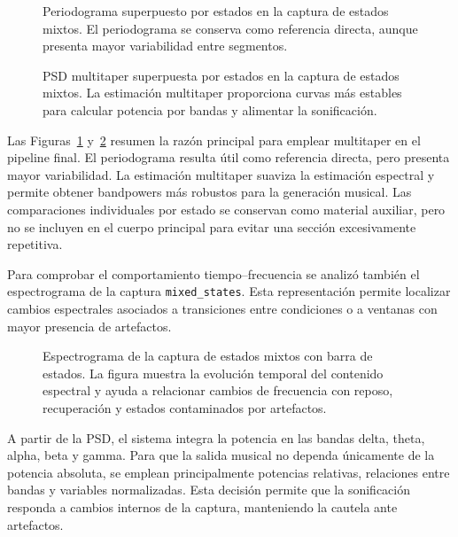 \documentclass[../main.tex]{subfiles}
\begin{document}
\begin{figure}[htbp]
    \centering
    \caption{Periodograma superpuesto por estados en la captura de estados mixtos. El periodograma se conserva como referencia directa, aunque presenta mayor variabilidad entre segmentos.}
    \label{fig:validacion_periodograma_por_estado}
\end{figure}

\begin{figure}[htbp]
    \centering
    \caption{PSD multitaper superpuesta por estados en la captura de estados mixtos. La estimación multitaper proporciona curvas más estables para calcular potencia por bandas y alimentar la sonificación.}
    \label{fig:validacion_multitaper_por_estado}
\end{figure}

Las Figuras~\ref{fig:validacion_periodograma_por_estado} y~\ref{fig:validacion_multitaper_por_estado} resumen la razón principal para emplear multitaper en el pipeline final. El periodograma resulta útil como referencia directa, pero presenta mayor variabilidad. La estimación multitaper suaviza la estimación espectral y permite obtener bandpowers más robustos para la generación musical. Las comparaciones individuales por estado se conservan como material auxiliar, pero no se incluyen en el cuerpo principal para evitar una sección excesivamente repetitiva.

Para comprobar el comportamiento tiempo--frecuencia se analizó también el espectrograma de la captura \texttt{mixed\_states}. Esta representación permite localizar cambios espectrales asociados a transiciones entre condiciones o a ventanas con mayor presencia de artefactos.

\begin{figure}[htbp]
    \centering
    \caption{Espectrograma de la captura de estados mixtos con barra de estados. La figura muestra la evolución temporal del contenido espectral y ayuda a relacionar cambios de frecuencia con reposo, recuperación y estados contaminados por artefactos.}
    \label{fig:validacion_spectrogram_state_bar}
\end{figure}

A partir de la PSD, el sistema integra la potencia en las bandas delta, theta, alpha, beta y gamma. Para que la salida musical no dependa únicamente de la potencia absoluta, se emplean principalmente potencias relativas, relaciones entre bandas y variables normalizadas. Esta decisión permite que la sonificación responda a cambios internos de la captura, manteniendo la cautela ante artefactos.
\end{document}
